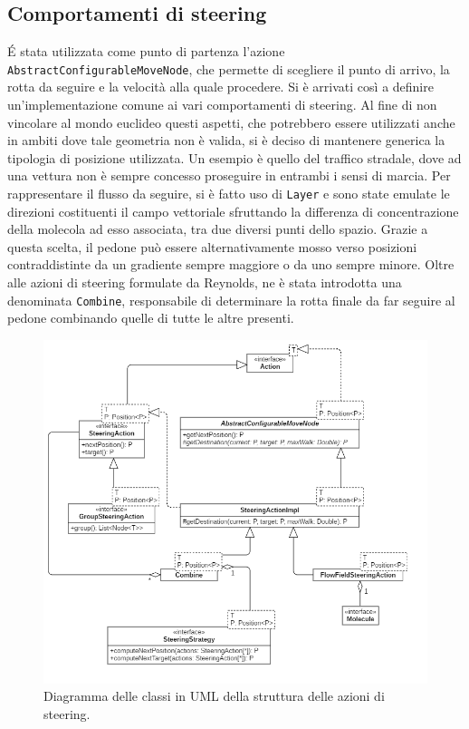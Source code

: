 \subsection{Comportamenti di steering}
É stata utilizzata come punto di partenza l'azione \texttt{AbstractConfigurableMoveNode}, che permette di scegliere il punto di arrivo, la rotta da seguire e la velocità alla quale procedere. Si è arrivati così a definire un'implementazione comune ai vari comportamenti di steering. \newline
Al fine di non vincolare al mondo euclideo questi aspetti, che potrebbero essere utilizzati anche in ambiti dove tale geometria non è valida, si è deciso di mantenere generica la tipologia di posizione utilizzata. Un esempio è quello del traffico stradale, dove ad una vettura non è sempre concesso proseguire in entrambi i sensi di marcia. \newline
Per rappresentare il flusso da seguire, si è fatto uso di \texttt{Layer} e sono state emulate le direzioni costituenti il campo vettoriale sfruttando la differenza di concentrazione della molecola ad esso associata, tra due diversi punti dello spazio. Grazie a questa scelta, il pedone può essere alternativamente mosso verso posizioni contraddistinte da un gradiente sempre maggiore o da uno sempre minore. \newline
Oltre alle azioni di steering formulate da Reynolds, ne è stata introdotta una denominata \texttt{Combine}, responsabile di determinare la rotta finale da far seguire al pedone combinando quelle di tutte le altre presenti.

\begin{figure}[ht]
  \centering
  \includegraphics[width=0.8\linewidth]{immagini/uml/steering-actions.png}
  \caption{Diagramma delle classi in UML della struttura delle azioni di steering.}
  \label{fig:steering-actions-uml}
\end{figure}

